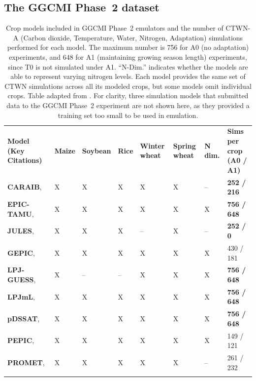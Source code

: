 \documentclass[gmdd]{copernicus} %
\begin{document}
\subsection{The GGCMI Phase~2 dataset}
\label{S:2a}
\begin{table}[ht]
    \caption{
    Crop models included in GGCMI Phase~2 emulators and the number of CTWN-A (Carbon dioxide, Temperature, Water, Nitrogen, Adaptation) simulations performed for each model. 
    The maximum number is 756 for A0 (no adaptation) experiments, and 648 for A1 (maintaining growing season length) experiments, since T0 is not simulated under A1. 
    ``N-Dim.'' indicates whether the models are able to represent varying nitrogen levels.
    Each model provides the same set of CTWN simulations across all its modeled crops, but some models omit individual crops.
    Table adapted from \citet{franke2020ctwnexperiment}. 
    For clarity, three simulation models that submitted data to the GGCMI Phase~2 experiment \citep{franke2020ctwnexperiment} are not shown here, as they provided a training set too small to be used in emulation.
    }
    \label{table:models}
    \begin{tabular}{p{6cm} p{1cm} p{1cm} p{1cm} p{1cm} p{1cm} p{1cm} p{1.9cm}}
        \tophline
        \textbf{Model (Key Citations)} & \textbf{Maize} & \textbf{Soybean} & \textbf{Rice} & \textbf{Winter wheat} & \textbf{Spring wheat} & \textbf{N dim.} & \textbf{Sims per crop (A0 / A1)}\\ \middlehline
        \textbf{CARAIB},    \citet{Dury2011, Pirttioja2015}    & X & X & X & X & X & -- & \textbf{252 / 216} \\ \middlehline
        \textbf{EPIC-TAMU}, \citet{Izaurralde06}               & X & X & X & X & X & X & \textbf{756 / 648} \\ \middlehline
        \textbf{JULES},     \citet{Osborne2015, Williams2015, Williams2017} & X & X & X & -- & X & -- & \textbf{252 / 0}\\ \middlehline
        \textbf{GEPIC},     \citet{LIU2007478, FOLBERTH201221} & X & X & X & X & X & X & 430 / 181\\ \middlehline
        \textbf{LPJ-GUESS}, \citet{Lindeskog2013, Olin2015}    & X & -- & -- & X & X & X & \textbf{756 / 648}\\  \middlehline
        \textbf{LPJmL},     \citet{von_Bloh_implementing_2018} & X & X & X & X & X & X & \textbf{756 / 648}\\ \middlehline
        \textbf{pDSSAT},    \citet{Elliott2014b, JONES2003235} & X & X & X & X & X & X & \textbf{756 / 648}\\ \middlehline
        \textbf{PEPIC},     \citet{LIU2016164, LIU2016}        & X & X & X & X & X & X & 149 / 121\\ \middlehline
        \textbf{PROMET},    \citet{Hank2015, MAUSER2015, Zabel2019}  & X & X & X & X & X & -- & 261 / 232\\
        \bottomhline
    \end{tabular}
\end{table}
\end{document}
